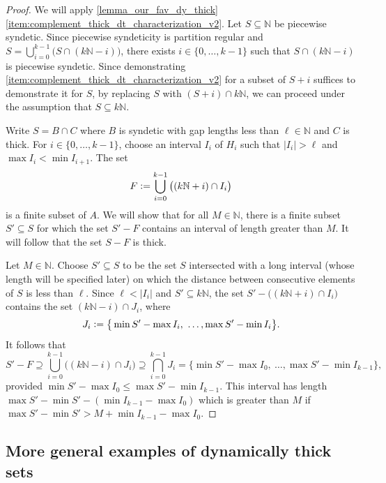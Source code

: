 \documentclass[letter,11pt]{article}
\theoremstyle{plain}
\theoremstyle{definition}
\theoremstyle{plain}
\theoremstyle{plain}
\numberwithin{equation}{section}
\newcommand{\N}{\mathbb{N}}
\newcommand{\defeq}{\vcentcolon=}
\renewcommand{\leq}{\leqslant}
\begin{document}
\begin{proof}
    We will apply \cref{lemma_our_fav_dy_thick} \eqref{item:complement_thick_dt_characterization_v2}.  Let $S \subseteq \N$ be piecewise syndetic.  Since piecewise syndeticity is partition regular and $S = \bigcup_{i=0}^{k-1} \big(S \cap (k\N - i)\big)$, there exists $i \in \{0, \ldots, k-1\}$ such that $S \cap (k \N - i)$ is piecewise syndetic.  Since demonstrating \eqref{item:complement_thick_dt_characterization_v2} for a subset of $S+i$ suffices to demonstrate it for $S$, by replacing $S$ with $(S+i) \cap k\N$, we can proceed under the assumption that $S \subseteq k \N$.

      
    
    Write $S = B \cap C$ where $B$ is syndetic with gap lengths less than $\ell \in \N$ and $C$ is thick. For $i \in \{0, \ldots, k-1\}$, choose an interval $I_i$ of $H_i$ such that $|I_i| > \ell$ and $\max I_i < \min I_{i+1}$. The set 
    \[
        F \defeq \bigcup_{i=0}^{k-1} \big( (k\N + i) \cap I_i \big)
    \]
    is a finite subset of $A$. 
    We will show that for all $M \in \N$, there is a finite subset $S' \subseteq S$ for which the set $S' - F$ contains an interval of length greater than $M$. It will follow that the set $S - F$ is thick.

    Let $M \in \N$.  Choose $S' \subseteq S$ to be the set $S$ intersected with a long interval (whose length will be specified later) on which the distance between consecutive elements of $S$ is less than $\ell$.  Since $\ell < |I_i|$ and $S' \subseteq k\N$, the set $S' - \big((k\N + i) \cap I_i \big)$ contains the set $(k \N - i) \cap J_i$, where
    \[
        J_i \defeq \big\{\min S' - \max I_i, \ \ldots, \max S' - \min I_i \big\}.
    \]
    It follows that
    \[
        S' - F \supseteq \bigcup_{i=0}^{k-1} \big((k \N - i) \cap J_i\big) \supseteq \bigcap_{i=0}^{k-1} J_i = \big\{\min S' - \max I_0, \ \ldots, \max S' - \min I_{k-1} \big\},
    \]
    provided $\min S' - \max I_0 \leq \max S' - \min I_{k-1}$.  This interval has length $\max S' - \min S' - (\min I_{k-1} - \max I_0)$ which is greater than $M$ if $\max S' - \min S' > M + \min I_{k-1} - \max I_0$.
\end{proof}




\subsection{More general examples of dynamically thick sets}
\label{sec_dy_thick_examples}
\end{document}
